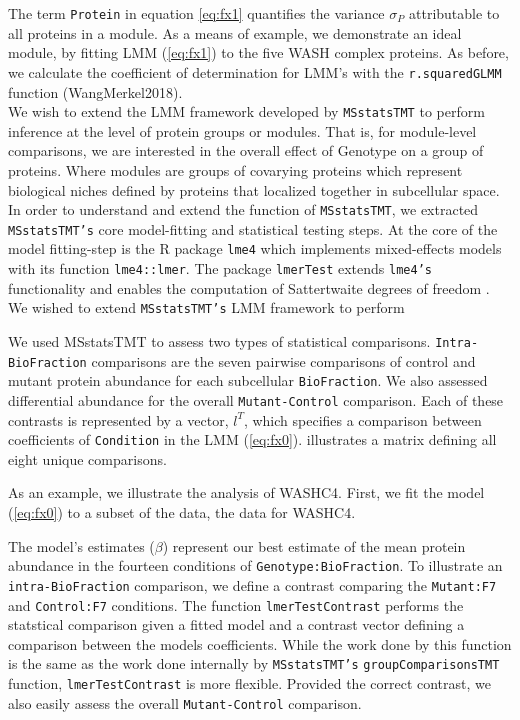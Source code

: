\documentclass[11pt]{elife}\usepackage[]{graphicx}\usepackage[]{color}
\begin{document}
The term \texttt{Protein} in equation \ref{eq:fx1} quantifies the variance
$\sigma_P$ attributable to all proteins in a module.  As a means of example, we
demonstrate an ideal module, by fitting LMM (\ref{eq:fx1}) to the five WASH
complex proteins.  As before, we calculate the coefficient of determination for
LMM's with the \texttt{r.squaredGLMM} function (WangMerkel2018).\\


We wish to extend the LMM framework developed by \texttt{MSstatsTMT} to perform 
inference at the level of protein groups or modules.
That is, for module-level comparisons, we are interested in the overall effect 
of Genotype on a group of proteins. Where modules are groups of covarying 
proteins which represent biological niches defined by proteins that 
localized together in subcellular space.\\


In order to understand and extend the function of \texttt{MSstatsTMT}, we
extracted \texttt{MSstatsTMT's} core model-fitting and statistical testing
steps.  At the core of the model fitting-step is the R package \texttt{lme4}
which implements mixed-effects models with its function
\texttt{lme4::lmer}\citep{Bates2015}. The package \texttt{lmerTest} extends
\texttt{lme4's} functionality and enables the computation of Sattertwaite
degrees of freedom \citep{Kuznetsova2017}. 
We  wished to extend \texttt{MSstatsTMT's} LMM framework to perform

We used MSstatsTMT to assess two types of statistical comparisons. 
\texttt{Intra-BioFraction} comparisons are the seven pairwise comparisons of 
control and mutant protein abundance for each subcellular
\texttt{BioFraction}. We also assessed differential abundance for the 
overall \texttt{Mutant-Control} comparison. Each of these contrasts is 
represented by a vector, $l^T$, which specifies a comparison between 
coefficients of \texttt{Condition} in the LMM (\ref{eq:fx0}).
 illustrates a matrix defining all eight unique comparisons.

As an example, we illustrate the
analysis of WASHC4.  First, we fit the model (\ref{eq:fx0}) to a subset of the
data, the data for WASHC4.

The model's estimates ($\beta$) represent our best estimate of the mean protein
abundance in the fourteen conditions of \texttt{Genotype:BioFraction}. 
To illustrate an \texttt{intra-BioFraction} comparison, we 
define a contrast comparing the \texttt{Mutant:F7} and \texttt{Control:F7}
conditions. The function \texttt{lmerTestContrast} performs the statstical comparison given
a fitted model and a contrast vector defining a comparison between the models
coefficients. While the work done by this function 
is the same as the work done internally by \texttt{MSstatsTMT's}
\texttt{groupComparisonsTMT} function, \texttt{lmerTestContrast} is more
flexible. Provided the correct contrast, we also easily assess the overall
\texttt{Mutant-Control} comparison.\\
\end{document}

